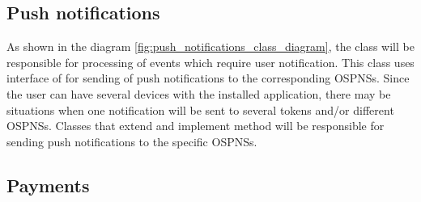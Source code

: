 \subsection{Push notifications}
As shown in the diagram \ref{fig:push_notifications_class_diagram}, the  class will be responsible
for processing of events which require user notification. This class uses interface of 
for sending of push notifications to the corresponding \ac{OSPNS}s. Since the user can have several devices with the
installed application, there may be situations when one notification will be sent to several tokens and/or different
\ac{OSPNS}s. Classes that extend  and implement method  will be
responsible for sending push notifications to the specific \ac{OSPNS}s.



\subsection{Payments}



